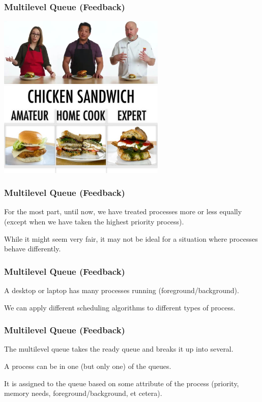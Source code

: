 \begin{frame}
\frametitle{Multilevel Queue (Feedback)}

\begin{center}
	\includegraphics[width=0.6\textwidth]{images/levels1.jpg}
	\includegraphics[width=0.6\textwidth]{images/levels2.jpg}
\end{center}


\end{frame}

\begin{frame}
\frametitle{Multilevel Queue (Feedback)}

For the most part, until now, we have treated processes more or less equally (except when we have taken the highest priority process). 

While it might seem very fair, it may not be ideal for a situation where processes behave differently. 

\end{frame}

\begin{frame}
\frametitle{Multilevel Queue (Feedback)}

A desktop or laptop has many processes running (foreground/background). 

We can apply different scheduling algorithms to different types of process.

\end{frame}

\begin{frame}
\frametitle{Multilevel Queue (Feedback)}

The multilevel queue takes the ready queue and breaks it up into several. 

A process can be in one (but only one) of the queues. 

It is assigned to the queue based on some attribute of the process (priority, memory needs, foreground/background, et cetera). 


\end{frame}

